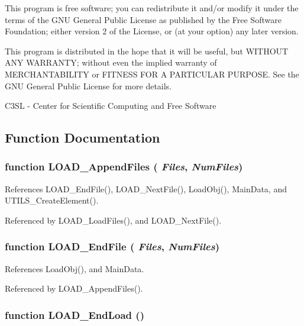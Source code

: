 This program is free software; you can redistribute it and/or modify it under the terms of the GNU General Public License as published by the Free Software Foundation; either version 2 of the License, or (at your option) any later version.

This program is distributed in the hope that it will be useful, but WITHOUT ANY WARRANTY; without even the implied warranty of MERCHANTABILITY or FITNESS FOR A PARTICULAR PURPOSE. See the GNU General Public License for more details.

C3SL - Center for Scientific Computing and Free Software 

\subsection{Function Documentation}
\subsubsection[LOAD\_\-AppendFiles]{\setlength{\rightskip}{0pt plus 5cm}function LOAD\_\-AppendFiles ( {\em Files}, \/   {\em NumFiles})}\label{load_2load_8js_5295c7592a04f1609a66b5e6a71ae52c}




References LOAD\_\-EndFile(), LOAD\_\-NextFile(), LoadObj(), MainData, and UTILS\_\-CreateElement().

Referenced by LOAD\_\-LoadFiles(), and LOAD\_\-NextFile().
\subsubsection[LOAD\_\-EndFile]{\setlength{\rightskip}{0pt plus 5cm}function LOAD\_\-EndFile ( {\em Files}, \/   {\em NumFiles})}\label{load_2load_8js_042b445dd6812962d5843aea2c04fb7c}




References LoadObj(), and MainData.

Referenced by LOAD\_\-AppendFiles().
\subsubsection[LOAD\_\-EndLoad]{\setlength{\rightskip}{0pt plus 5cm}function LOAD\_\-EndLoad ()}\label{load_2load_8js_b9e066bdb106d6b75e3202b2a55c262e}


